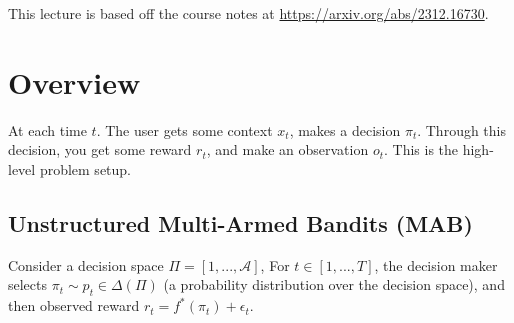 This lecture is based off the course notes at \url{https://arxiv.org/abs/2312.16730}.

\section{Overview}
At each time $t$. The user gets some context $x_t$, makes a decision $\pi_t$. Through this decision, you get some reward $r_t$, and make an observation $o_t$. This is the high-level problem setup.

\subsection{Unstructured Multi-Armed Bandits (MAB)}
Consider a decision space $\Pi = [1, ..., \mathcal A]$,
For $t \in [1,..., T]$, the decision maker selects $\pi_t \sim p_t \in \Delta(\Pi)$ (a probability distribution over the decision space), and then observed reward $r_t = f^*(\pi_t) + \epsilon_t$.

